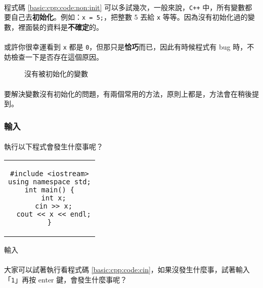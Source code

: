 \documentclass[12pt,a4paper,oneside]{article}
\begin{document}
\begin{CJK}{UTF8}{bkai}
\paragraph{}程式碼 \ref{basic:cpp:code:non:init} 可以多試幾次，一般來說，\texttt{C++} 中，所有變數都要自己去\textbf{初始化}。例如：\lstinline!x = 5;!，把整數 5 丟給 \lstinline!x! 等等。因為沒有初始化過的變數，裡面裝的資料是\textbf{不確定}的。

\paragraph{}或許你很幸運看到 \lstinline!x! 都是 \lstinline!0!，但那只是\textbf{恰巧}而已，因此有時候程式有 bug 時，不妨檢查一下是否存在這個原因。

\begin{figure}[h!]
\centering
{}
\caption{沒有被初始化的變數}
\label{basic:cpp:fig:non:init:variable}
\end{figure}

\paragraph{}要解決變數沒有初始化的問題，有兩個常用的方法，原則上都是，方法會在稍後提到。

\subsubsection{輸入}

\paragraph{}執行以下程式會發生什麼事呢？

\begin{code}[h!]
\centering
\begin{tabular}{c}
\begin{lstlisting}
#include <iostream>
using namespace std;
int main() {
  int x;
  cin >> x;
  cout << x << endl;
}
\end{lstlisting}
\end{tabular}
\caption{輸入}
\label{basic:cpp:code:cin}
\end{code}

\paragraph{}大家可以試著執行看程式碼 \ref{basic:cpp:code:cin}，如果沒發生什麼事，試著輸入「\lstinline!1!」再按 enter 鍵，會發生什麼事呢？

\end{CJK}
\end{document}
